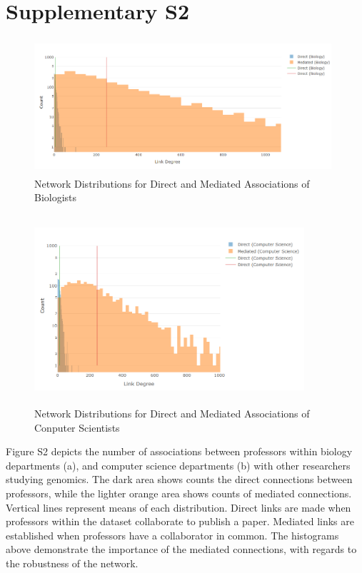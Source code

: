 \documentclass[10pt]{article}         %
\begin{document}
\section{Supplementary S2}
\begin{figure}[!htb]
  \centering
  \includegraphics[width=11cm, height=5cm]{Fig2SA.PNG}
  \caption{Network Distributions for Direct and Mediated Associations of Biologists}
  \label{fig:S2A}
\end{figure}
\begin{figure}[!htb]
  \centering
  \includegraphics[width=10cm, height=7cm]{Fig2SB.PNG}
  \caption{Network Distributions for Direct and Mediated Associations of Conputer Scientists}
  \label{fig:S2B}
\end{figure}
Figure S2 depicts the number of associations between professors within biology departments (a), and computer science departments (b) with other researchers studying genomics. The dark area shows counts the direct connections between professors, while the lighter orange area shows counts of mediated connections. Vertical lines represent means of each distribution. Direct links are made when professors within the dataset collaborate to publish a paper. Mediated links are established when professors have a collaborator in common. The histograms above demonstrate the importance of the mediated connections, with regards to the robustness of the network. 
\end{document}
